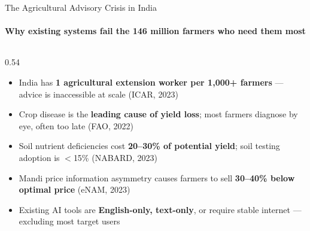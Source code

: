 \documentclass[aspectratio=169, 10pt]{beamer}
\begin{document}
\begin{frame}{The Agricultural Advisory Crisis in India}
  \framesubtitle{Why existing systems fail the 146 million farmers who need them most}

  \vspace{-0.4em}
  \begin{columns}[T]
    \begin{column}{0.54\textwidth}
      \begin{itemize}[itemsep=1.2pt, topsep=0.8pt]\footnotesize
        \item India has \textbf{1 agricultural extension worker per 1{,}000+ farmers} — advice is inaccessible at scale \textcolor{Muted}{(ICAR, 2023)}
        \item Crop disease is the \textbf{leading cause of yield loss}; most farmers diagnose by eye, often too late \textcolor{Muted}{(FAO, 2022)}
        \item Soil nutrient deficiencies cost \textbf{20--30\% of potential yield}; soil testing adoption is $<$15\% \textcolor{Muted}{(NABARD, 2023)}
        \item Mandi price information asymmetry causes farmers to sell \textbf{30--40\% below optimal price} \textcolor{Muted}{(eNAM, 2023)}
        \item Existing AI tools are \textbf{English-only, text-only}, or require stable internet — excluding most target users
      \end{itemize}
    \end{column}


\end{columns}
\end{frame}
\end{document}
